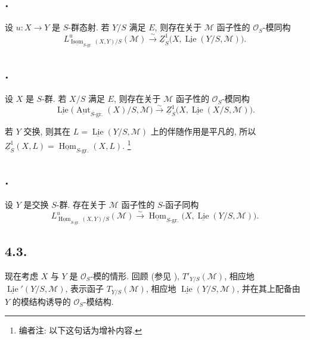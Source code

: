 \subsection*{.}
设 \(u:X\to Y\) 是 \(S\)-群态射. 若 \(Y/S\) 满足 \(E\),
则存在关于 \(\mathcal M\) 函子性的 \(\mathcal O_S\)-模同构
\[
 L^u_{\underline{\operatorname{Isom}}_{S\text{-gr.}}(X,Y)/S}
   (\mathcal M)
 \xrightarrow{\sim}
 \underline Z^1_S
   \bigl(X,\underline{\operatorname{Lie}}(Y/S,\mathcal M)\bigr).
\]

\subsection*{.}
设 \(X\) 是 \(S\)-群. 若 \(X/S\) 满足 \(E\), 则存在关于 \(\mathcal M\)
函子性的 \(\mathcal O_S\)-模同构
\[
 \underline{\operatorname{Lie}}
   \bigl(\underline{\operatorname{Aut}}_{S\text{-gr.}}(X)/S,
         \mathcal M\bigr)
 \xrightarrow{\sim}
 \underline Z^1_S
   \bigl(X,\underline{\operatorname{Lie}}(X/S,\mathcal M)\bigr).
\]

若 \(Y\) 交换, 则其在 \(L=\underline{\operatorname{Lie}}(Y/S,\mathcal M)\)
上的伴随作用是平凡的, 所以
\(\underline Z^1_S(X,L)=
\underline{\operatorname{Hom}}_{S\text{-gr.}}(X,L)\).
\footnote{编者注: 以下这句话为增补内容.}

\subsection*{.}
设 \(Y\) 是交换 \(S\)-群. 存在关于 \(\mathcal M\) 函子性的
\(S\)-函子同构
\[
 L^u_{\underline{\operatorname{Hom}}_{S\text{-gr.}}(X,Y)/S}
   (\mathcal M)
 \xrightarrow{\sim}
 \underline{\operatorname{Hom}}_{S\text{-gr.}}
   \bigl(X,\underline{\operatorname{Lie}}(Y/S,\mathcal M)\bigr).
\]

\subsection*{4.3.}
现在考虑 \(X\) 与 \(Y\) 是 \(\mathcal O_S\)-模的情形.
回顾 (参见 ),
\(T'_{Y/S}(\mathcal M)\), 相应地 \(\underline{\operatorname{Lie}}'(Y/S,\mathcal M)\),
表示函子 \(T_{Y/S}(\mathcal M)\), 相应地
\(\underline{\operatorname{Lie}}(Y/S,\mathcal M)\),
并在其上配备由 \(Y\) 的模结构诱导的 \(\mathcal O_S\)-模结构.

